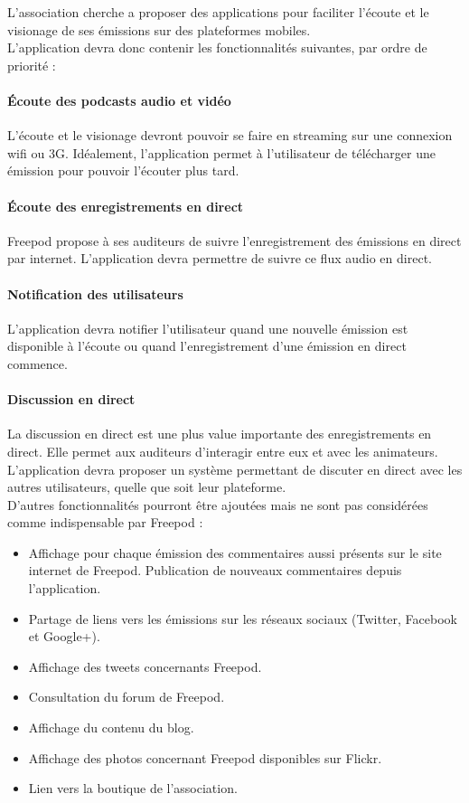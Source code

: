 \documentclass[11pt, french]{report}
\begin{document}
L’association cherche a proposer des applications pour faciliter l’écoute et le visionage de ses émissions sur des plateformes mobiles.\\

L’application devra donc contenir les fonctionnalités suivantes, par ordre de priorité :

\paragraph{Écoute des podcasts audio et vidéo}
L’écoute et le visionage devront pouvoir se faire en streaming sur une connexion wifi ou 3G. Idéalement, l’application permet à l’utilisateur de télécharger une émission pour pouvoir l’écouter plus tard.

\paragraph{Écoute des enregistrements en direct}
Freepod propose à ses auditeurs de suivre l’enregistrement des émissions en direct par internet. L’application devra permettre de suivre ce flux audio en direct.

\paragraph{Notification des utilisateurs}
L’application devra notifier l’utilisateur quand une nouvelle émission est disponible à l’écoute ou quand l’enregistrement d’une émission en direct commence.

\paragraph{Discussion en direct}
La discussion en direct est une plus value importante des enregistrements en direct. Elle permet aux auditeurs d'interagir entre eux et avec les animateurs. L’application devra proposer un système permettant de discuter en direct avec les autres utilisateurs, quelle que soit leur plateforme.\\

D’autres fonctionnalités pourront être ajoutées mais ne sont pas considérées comme indispensable par Freepod :
\begin{itemize}
\item Affichage pour chaque émission des commentaires aussi présents sur le site internet de Freepod. Publication de nouveaux commentaires depuis l’application.
\item Partage de liens vers les émissions sur les réseaux sociaux (Twitter, Facebook et Google+).
\item Affichage des tweets concernants Freepod.
\item Consultation du forum de Freepod.
\item Affichage du contenu du blog.
\item Affichage des photos concernant Freepod disponibles sur Flickr.
\item Lien vers la boutique de l’association.
\end{itemize}
\end{document}
